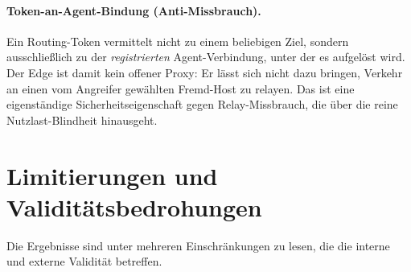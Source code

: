 \paragraph{Token-an-Agent-Bindung (Anti-Missbrauch).} Ein Routing-Token vermittelt
nicht zu einem beliebigen Ziel, sondern ausschließlich zu der \emph{registrierten}
Agent-Verbindung, unter der es aufgelöst wird. Der Edge ist damit kein offener
Proxy: Er lässt sich nicht dazu bringen, Verkehr an einen vom Angreifer gewählten
Fremd-Host zu relayen. Das ist eine eigenständige Sicherheitseigenschaft gegen
Relay-Missbrauch, die über die reine Nutzlast-Blindheit hinausgeht.

\section{Limitierungen und Validitätsbedrohungen}
\label{sec:limitierungen}

Die Ergebnisse sind unter mehreren Einschränkungen zu lesen, die die interne und
externe Validität betreffen.

